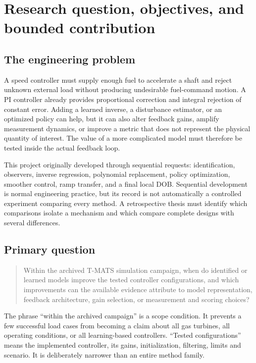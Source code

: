 \chapter{Research question, objectives, and bounded contribution}
\label{ch:question}
\section{The engineering problem}
A speed controller must supply enough fuel to accelerate a shaft and reject unknown external load without producing undesirable fuel-command motion. A PI controller already provides proportional correction and integral rejection of constant error. Adding a learned inverse, a disturbance estimator, or an optimized policy can help, but it can also alter feedback gains, amplify measurement dynamics, or improve a metric that does not represent the physical quantity of interest. The value of a more complicated model must therefore be tested inside the actual feedback loop.

This project originally developed through sequential requests: identification, observers, inverse regression, polynomial replacement, policy optimization, smoother control, ramp transfer, and a final local DOB. Sequential development is normal engineering practice, but its record is not automatically a controlled experiment comparing every method. A retrospective thesis must identify which comparisons isolate a mechanism and which compare complete designs with several differences.

\section{Primary question}
\begin{quote}
Within the archived T-MATS simulation campaign, when do identified or learned models improve the tested controller configurations, and which improvements can the available evidence attribute to model representation, feedback architecture, gain selection, or measurement and scoring choices?
\end{quote}
The phrase ``within the archived campaign'' is a scope condition. It prevents a few successful load cases from becoming a claim about all gas turbines, all operating conditions, or all learning-based controllers. ``Tested configurations'' means the implemented controller, its gains, initialization, filtering, limits and scenario. It is deliberately narrower than an entire method family.

